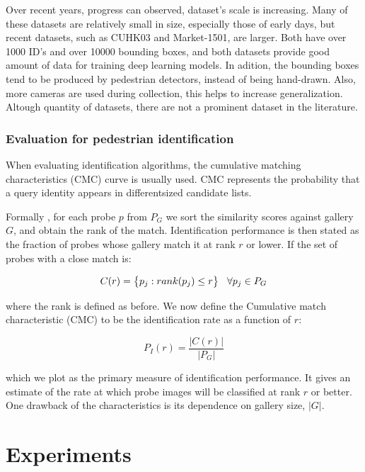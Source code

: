 \documentclass[12pt, a4paper, titlepage,twoside,openright]{article}
\newcommand\abs[1]{\left|#1\right|}
\begin{document}
Over recent years, progress can observed, dataset's scale is increasing. Many of these datasets are relatively small in size, especially those of early days, but recent datasets, such as CUHK03 and Market-1501, are larger. Both have over 1000 ID's and over 10000 bounding boxes, and both datasets provide good amount of data for training deep learning models. In adition, the bounding boxes tend to be produced by pedestrian detectors, instead of being hand-drawn. Also, more cameras are used during collection, this helps to increase generalization. Altough quantity of datasets, there are not a prominent dataset in the literature.

\subsubsection{Evaluation for pedestrian identification}


When evaluating identification algorithms, the cumulative matching characteristics (CMC) curve is usually used. CMC represents the probability that a query identity appears in differentsized candidate lists.

Formally \cite{faceCMC}, for each probe $p$ from $P_{G}$ we sort the similarity scores against gallery $G$, and obtain the rank of the match. Identification performance is then stated as the fraction of probes whose gallery match it at rank $r$  or lower. If the set of probes with a close match is:

$$ C(r) = \big\{ p_{j}: rank(p_{j}) \leq r  \bigr\} \hspace{0.3cm} \forall p_{j} \in P_{G}  $$

where the rank is defined as before. We now define the Cumulative match characteristic (CMC) to be the identification rate as a function of $r$:

$$ P_{I}(r) = \dfrac{\abs{C(r)}}{\abs{P_{G}}} $$

which we plot as the primary measure of identification performance. It gives an estimate of the rate at which probe images will be classified at rank $r$ or better. One drawback of the characteristics is its dependence on gallery size, $\abs{G}$.



\section{Experiments}
\end{document}
